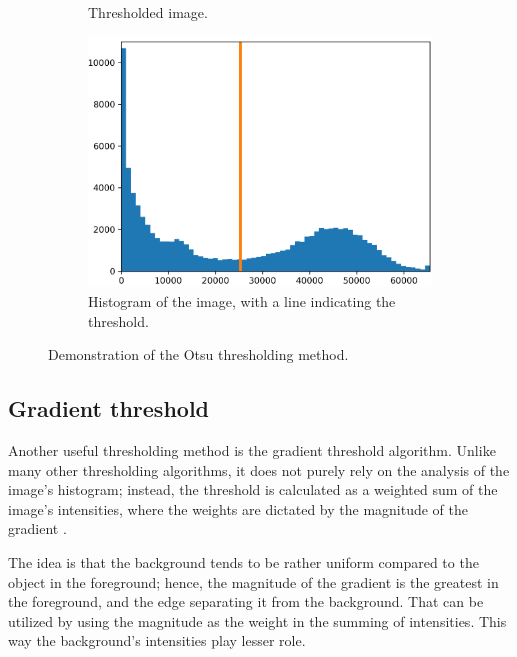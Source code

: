 \documentclass[
  digital,     %
  oneside,     %
  nosansbold,  %
  nocolorbold, %
  lof,         %
  lot,         %
]{fithesis4}
\begin{document}
\begin{figure}
\begin{subfigure}[t]{0.45\textwidth}
        \caption{Thresholded image.}
        \label{fig:otsu-thresholded}
    \end{subfigure}
    \begin{subfigure}[t]{0.6\textwidth}
        \centering
        \includegraphics[width=\textwidth]{resources/otsu-histogram.png}
        \caption{Histogram of the image, with a line indicating the threshold.}
        \label{fig:otsu-histogram}
    \end{subfigure}
    \caption{Demonstration of the Otsu thresholding method.}
    \label{fig:otsu-demonstration}
\end{figure}


\subsection{Gradient threshold}

Another useful thresholding method is the gradient threshold algorithm. Unlike
many other thresholding algorithms, it does not purely rely on the analysis of
the image's histogram; instead, the threshold is calculated as a weighted sum of
the image's intensities, where the weights are dictated by the magnitude of the
gradient \cite{pb130}.

The idea is that the background tends to be rather uniform compared to the
object in the foreground; hence, the magnitude of the gradient is the greatest
in the foreground, and the edge separating it from the background. That can be
utilized by using the magnitude as the weight in the summing of intensities.
This way the background's intensities play lesser role.
\end{document}
